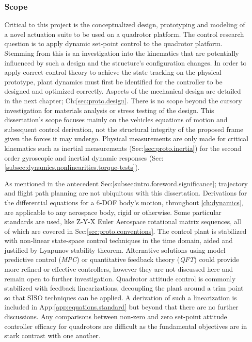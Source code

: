 \subsubsection{Scope}
\label{subsubsec:intro.foreword.scope}
Critical to this project is the conceptualized design, prototyping and modeling of a novel actuation suite to be used on a quadrotor platform. The control research question is to apply dynamic set-point control to the quadrotor platform. Stemming from this is an investigation into the kinematics that are potentially influenced by such a design and the structure's configuration changes. In order to apply correct control theory to achieve the state tracking on the physical prototype, plant dynamics must first be identified for the controller to be designed and optimized correctly. Aspects of the mechanical design are detailed in the next chapter; Ch:\ref{sec:proto.design}. There is no scope beyond the cursory investigation for materials analysis or stress testing of the design. This dissertation's scope focuses mainly on the vehicles equations of motion and subsequent control derivation, not the structural integrity of the proposed frame given the forces it may undergo. Physical measurements are only made for critical kinematics such as inertial measurements (Sec:\ref{sec:proto.inertia}) for the second order gyroscopic and inertial dynamic responses (Sec:\ref{subsec:dynamics.nonlinearities.torque-tests}).
\par
As mentioned in the antecedent Sec:\ref{subsec:intro.foreword.significance}; trajectory and flight path planning are not ubiquitous with this dissertation. Derivations for the differential equations for a 6-DOF body's motion, throughout \ref{ch:dynamics}, are applicable to any aerospace body, rigid or otherwise. Some particular standards are used, like Z-Y-X Euler Aerospace rotational matrix sequences, all of which are covered in Sec:\ref{sec:proto.conventions}. The control plant is stabilized with non-linear state-space control techniques in the time domain, aided and justified by Lyapunov stability theorem\cite{noteonlyapunov,nonlinearsystems,bojelayupanov}. Alternative solutions using model predictive control (\emph{MPC}) or quantitative feedback theory (\emph{QFT}) could provide more refined or effective controllers, however they are not discussed here and remain open to further investigation. Quadrotor attitude control is commonly stabilized with feedback linearizations, decoupling the plant around a trim point so that SISO techniques can be applied. A derivation of such a linearization is included in App:\ref{app:equations.standard} but beyond that there are no further discussions. Any comparisons between non-zero and zero set-point attitude controller efficacy for quadrotors are difficult as the fundamental objectives are in stark contrast with one another.
